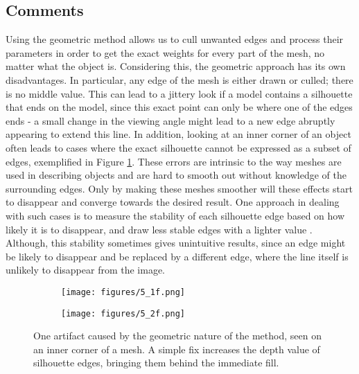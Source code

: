 \documentclass[a4paper,10pt]{article}
\begin{document}
\subsection{Comments}
Using the geometric method allows us to cull unwanted edges and process their parameters in order to get the exact weights for every part of the mesh, no matter what the object is. Considering this, the geometric approach has its own disadvantages. In particular, any edge of the mesh is either drawn or culled; there is no middle value. This can lead to a jittery look if a model contains a silhouette that ends on the model, since this exact point can only be where one of the edges ends - a small change in the viewing angle might lead to a new edge abruptly appearing to extend this line. In addition, looking at an inner corner of an object often leads to cases where the exact silhouette cannot be expressed as a subset of edges, exemplified in Figure \ref{inner}. These errors are intrinsic to the way meshes are used in describing objects and are hard to smooth out without knowledge of the surrounding edges. Only by making these meshes smoother will these effects start to disappear and converge towards the desired result. One approach in dealing with such cases is to measure the stability of each silhouette edge based on how likely it is to disappear, and draw less stable edges with a lighter value \cite{Brosz2004}. Although, this stability sometimes gives unintuitive results, since an edge might be likely to disappear and be replaced by a different edge, where the line itself is unlikely to disappear from the image.

\begin{figure}[htbp!]
  \centering
  \begin{subfigure}{0.25\columnwidth}
    \texttt{[image: figures/5\_1f.png]}
  \end{subfigure}
  \begin{subfigure}{0.25\columnwidth}
    \texttt{[image: figures/5\_2f.png]}
  \end{subfigure}
  \caption{One artifact caused by the geometric nature of the method, seen on an inner corner of a mesh. A simple fix increases the depth value of silhouette edges, bringing them behind the immediate fill.}
  \label{inner}
\end{figure}
\end{document}
